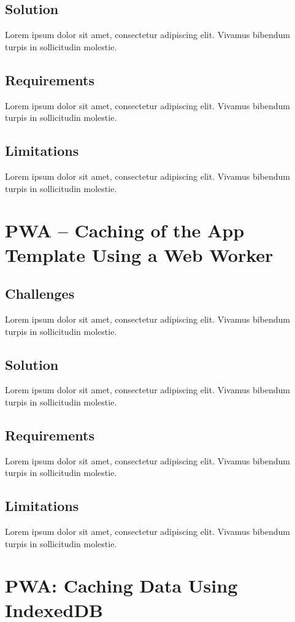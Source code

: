 \documentclass[11pt, a4paper]{article}
\begin{document}
\subsection{Solution}
Lorem ipsum dolor sit amet, consectetur adipiscing elit. Vivamus bibendum turpis in sollicitudin
molestie.

\subsection{Requirements}
Lorem ipsum dolor sit amet, consectetur adipiscing elit. Vivamus bibendum turpis in sollicitudin
molestie.

\subsection{Limitations}
Lorem ipsum dolor sit amet, consectetur adipiscing elit. Vivamus bibendum turpis in sollicitudin
molestie.

\section{PWA – Caching of the App Template Using a Web Worker}
\subsection{Challenges}
Lorem ipsum dolor sit amet, consectetur adipiscing elit. Vivamus bibendum turpis in sollicitudin
molestie.

\subsection{Solution}
Lorem ipsum dolor sit amet, consectetur adipiscing elit. Vivamus bibendum turpis in sollicitudin
molestie.

\subsection{Requirements}
Lorem ipsum dolor sit amet, consectetur adipiscing elit. Vivamus bibendum turpis in sollicitudin
molestie.

\subsection{Limitations}
Lorem ipsum dolor sit amet, consectetur adipiscing elit. Vivamus bibendum turpis in sollicitudin
molestie.

\section{PWA: Caching Data Using IndexedDB}
\end{document}
